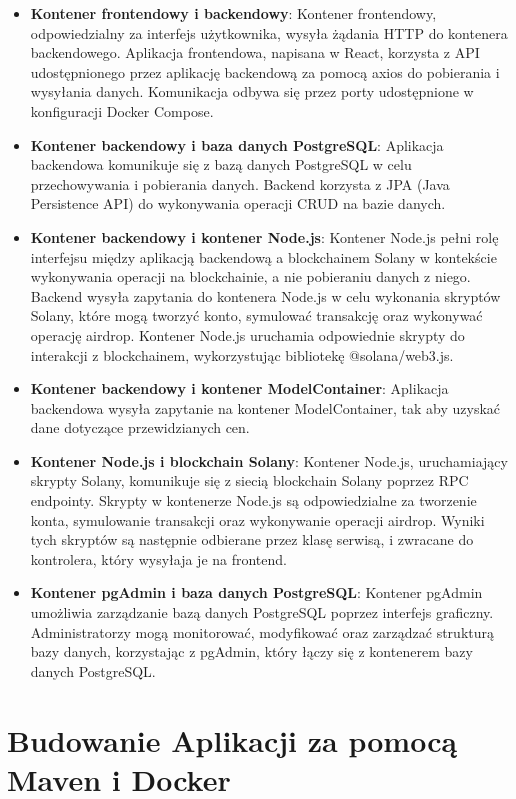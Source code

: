 \begin{itemize}
    \item \textbf{Kontener frontendowy i backendowy}: Kontener frontendowy, odpowiedzialny za interfejs użytkownika, wysyła żądania HTTP do kontenera backendowego. Aplikacja frontendowa, napisana w React, korzysta z API udostępnionego przez aplikację backendową za pomocą axios do pobierania i wysyłania danych. Komunikacja odbywa się przez porty udostępnione w konfiguracji Docker Compose.
    \item \textbf{Kontener backendowy i baza danych PostgreSQL}: Aplikacja backendowa komunikuje się z bazą danych PostgreSQL w celu przechowywania i pobierania danych. Backend korzysta z JPA (Java Persistence API) do wykonywania operacji CRUD na bazie danych.
    \item \textbf{Kontener backendowy i kontener Node.js}: Kontener Node.js pełni rolę interfejsu między aplikacją backendową a blockchainem Solany w kontekście wykonywania operacji na blockchainie, a nie pobieraniu danych z niego. Backend wysyła zapytania do kontenera Node.js w celu wykonania skryptów Solany, które mogą tworzyć konto, symulować transakcję oraz wykonywać operację airdrop. Kontener Node.js uruchamia odpowiednie skrypty do interakcji z blockchainem, wykorzystując bibliotekę @solana/web3.js.
		\item \textbf{Kontener backendowy i kontener ModelContainer}: Aplikacja backendowa wysyła zapytanie na kontener ModelContainer, tak aby uzyskać dane dotyczące przewidzianych cen. 
    \item \textbf{Kontener Node.js i blockchain Solany}: Kontener Node.js, uruchamiający skrypty Solany, komunikuje się z siecią blockchain Solany poprzez RPC endpointy. Skrypty w kontenerze Node.js są odpowiedzialne za tworzenie konta, symulowanie transakcji oraz wykonywanie operacji airdrop. Wyniki tych skryptów są następnie odbierane przez klasę serwisą, i zwracane do kontrolera, który wysyłaja je na frontend.
    \item \textbf{Kontener pgAdmin i baza danych PostgreSQL}: Kontener pgAdmin umożliwia zarządzanie bazą danych PostgreSQL poprzez interfejs graficzny. Administratorzy mogą monitorować, modyfikować oraz zarządzać strukturą bazy danych, korzystając z pgAdmin, który łączy się z kontenerem bazy danych PostgreSQL.
\end{itemize}

\section{Budowanie Aplikacji za pomocą Maven i Docker}

